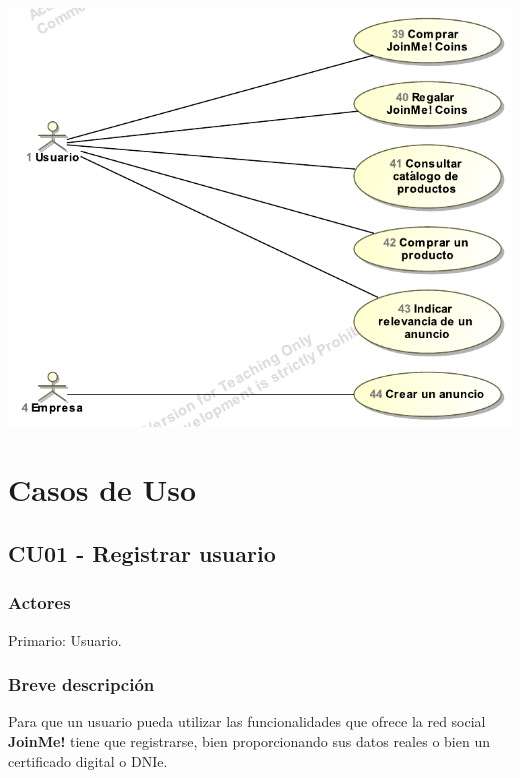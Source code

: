 \documentclass[12pt, a4paper, titlepage]{article}
\begin{document}
\vspace{2cm}
\begin{center}
\includegraphics[scale=0.9]{Imagenes/casosUso6}
\end{center}

\newpage






\section{Casos de Uso}

\subsection{CU01 - Registrar usuario}
\subsubsection{Actores}
Primario: Usuario.
\subsubsection{Breve descripción}
Para que un usuario pueda utilizar las funcionalidades que ofrece la red social \textbf{JoinMe!} tiene que registrarse, bien proporcionando sus datos reales o bien un certificado digital o DNIe.
\end{document}
